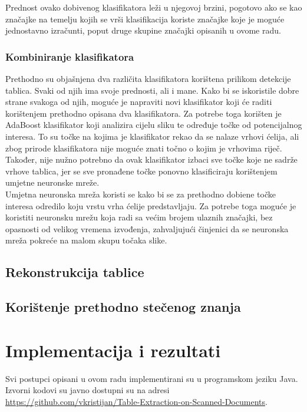 \documentclass[times, utf8, zavrsni, numeric]{fer}
\begin{document}
Prednost ovako dobivenog klasifikatora leži u njegovoj brzini, pogotovo ako se kao značajke na temelju kojih se vrši klasifikacija koriste značajke koje je moguće jednostavno izračunti, poput druge skupine značajki opisanih u ovome radu.


\subsection{Kombiniranje klasifikatora}
Prethodno su objašnjena dva različita klasifikatora korištena prilikom detekcije tablica.
Svaki od njih ima svoje prednosti, ali i mane.
Kako bi se iskoristile dobre strane svakoga od njih, moguće je napraviti novi klasifikator koji će raditi korištenjem prethodno opisana dva klasifikatora.
Za potrebe toga korišten je AdaBoost klasifikator koji analizira cijelu sliku te određuje točke od potencijalnog interesa. 
To su točke na kojima je klasifikator rekao da se nalaze vrhovi ćelija, ali zbog prirode klasifikatora nije moguće znati točno o kojim je vrhovima riječ.
Također, nije nužno potrebno da ovak klasifikator izbaci sve točke koje ne sadrže vrhove tablica, jer se sve pronađene točke ponovno klasificiraju korištenjem umjetne neuronske mreže.\\

Umjetna neuronska mreža koristi se kako bi se za prethodno dobiene točke interesa odredilo koju vrstu vrha ćelije predstavljaju.
Za potrebe toga moguće je koristiti neuronsku mrežu koja radi sa većim brojem ulaznih značajki, bez opasnosti od velikog vremena izvođenja, zahvaljujući činjenici da se neuronska mreža pokreće na malom skupu točaka slike. 

\section{Rekonstrukcija tablice}

\section{Korištenje prethodno stečenog znanja}

\chapter{Implementacija i rezultati} 
Svi postupci opisani u ovom radu implementirani su u programskom jeziku Java.
Izvorni kodovi su javno dostupni su na adresi \href{https://github.com/vkristijan/Table-Extraction-on-Scanned-Documents}{https://github.com/vkristijan/Table-Extraction-on-Scanned-Documents}.
\end{document}
